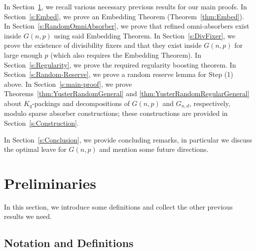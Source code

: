 \documentclass[11pt]{article}
\numberwithin{equation}{section}
\newcounter{i}
\theoremstyle{plain}
\theoremstyle{plain} %
\theoremstyle{definition}
\begin{document}
In Section~\ref{s:Previous}, we recall various necessary previous results for our main proofs. In Section~\ref{s:Embed}, we prove an Embedding Theorem (Theorem~\ref{thm:Embed}). In Section~\ref{s:RandomOmniAbsorber}, we prove that refined omni-absorbers exist inside $G(n,p)$ using said Embedding Theorem. In Section~\ref{s:DivFixer}, we prove the existence of divisibility fixers and that they exist inside $G(n,p)$ for large enough $p$ (which also requires the Embedding Theorem). In Section~\ref{s:Regularity}, we prove the required regularity boosting theorem. In Section~\ref{s:Random-Reserve}, we prove a random reserve lemma for Step (1) above.
In Section~\ref{s:main-proof}, we prove Theorems~\ref{thm:YusterRandomGeneral} and \ref{thm:YusterRandomRegularGeneral} about $K_q$-packings and decompositions of $G(n,p)$ and $G_{n,d}$, respectively, modulo sparse absorber constructions; these constructions are provided in Section~\ref{s:Construction}.

In Section~\ref{s:Conclusion}, we provide concluding remarks, in particular we discuss the optimal leave for $G(n,p)$ and mention some future directions.



\section{Preliminaries}\label{s:Previous}

In this section, we introduce some definitions and collect the other previous results we need.

\subsection{Notation and Definitions}\label{s:notation}
\end{document}
